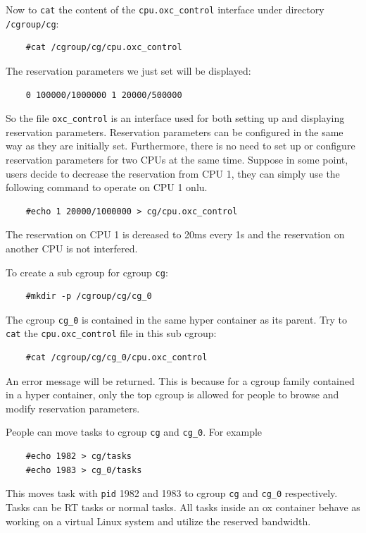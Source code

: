 Now to \texttt{cat} the content of the \texttt{cpu.oxc\_control} interface 
under directory \texttt{/cgroup/cg}:
\begin{lstlisting}
	#cat /cgroup/cg/cpu.oxc_control
\end{lstlisting}
The reservation parameters we just set will be displayed:
\begin{lstlisting}
	0 100000/1000000 1 20000/500000
\end{lstlisting}
So the file \texttt{oxc\_control} is an interface used for both setting up
and displaying reservation parameters. Reservation parameters can be 
configured in the same way as they are initially set. Furthermore,
there is no need to set up or configure reservation parameters for two 
CPUs at the same time. Suppose in some point, users decide to decrease 
the reservation from CPU 1, they can simply use the following command to
operate on CPU 1 onlu.
\begin{lstlisting}
	#echo 1 20000/1000000 > cg/cpu.oxc_control
\end{lstlisting}
The reservation on CPU 1 is dereased to 20ms every 1s and the reservation
on another CPU is not interfered. 

To create a sub cgroup for cgroup \texttt{cg}:
\begin{lstlisting}
	#mkdir -p /cgroup/cg/cg_0
\end{lstlisting}
The cgroup \texttt{cg\_0} is contained in the same hyper container as
its parent. Try to \texttt{cat} the \texttt{cpu.oxc\_control} file in 
this sub cgroup: 
\begin{lstlisting}
	#cat /cgroup/cg/cg_0/cpu.oxc_control
\end{lstlisting}
An error message will be returned. This is because for a cgroup family
contained in a hyper container, only the top cgroup is allowed for people
to browse and modify reservation parameters.

People can move tasks to cgroup \texttt{cg} and \texttt{cg\_0}. For example
\begin{lstlisting}
	#echo 1982 > cg/tasks
	#echo 1983 > cg_0/tasks
\end{lstlisting}
This moves task with \texttt{pid} 1982 and 1983 to cgroup \texttt{cg} and
\texttt{cg\_0} respectively. Tasks can be RT tasks or normal tasks. All 
tasks inside an ox container behave as working on a virtual Linux system
and utilize the reserved bandwidth.

